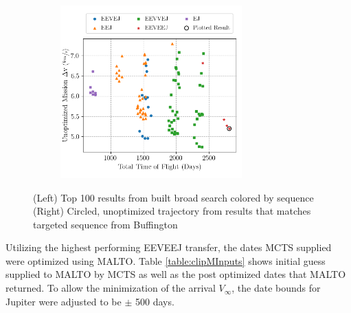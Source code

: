 \documentclass[letterpaper, preprint, paper,11pt]{AAS}	%
\begin{document}
\begin{figure}[htb]
    \begin{subfigure}
        \centering\includegraphics[width=2.75in]{./fig/clipperResults.png}
    \end{subfigure}
    \begin{subfigure}
        \centering
    \end{subfigure}
    \caption{(Left) Top 100 results from built broad search colored by sequence\hspace{1em} (Right) Circled, unoptimized trajectory from results that matches targeted sequence from Buffington \cite{Buffington2014}}
    \label{fig:clipResults}
\end{figure}

Utilizing the highest performing EEVEEJ transfer, the dates MCTS supplied were optimized using MALTO. Table \ref*{table:clipMInputs} shows initial guess supplied to MALTO by MCTS as well as the post optimized dates that MALTO returned. To allow the minimization of the arrival $V_\infty$, the date bounds for Jupiter were adjusted to be $\pm$ 500 days. 
\end{document}
